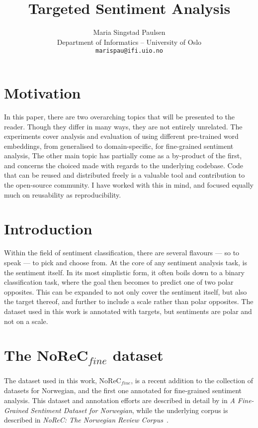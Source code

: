 \documentclass{acl2020}
\title{Targeted Sentiment Analysis}
\author{Maria Singstad Paulsen \\
  Department of Informatics – University of Oslo\\
  \texttt{marispau@ifi.uio.no}}
\date{}
\begin{document}
\maketitle

\begin{abstract}

\end{abstract}

\section{Motivation}
\label{sec:motivation}

In this paper, there are two overarching topics that will be presented to the reader. Though they differ in many ways, they are not entirely unrelated. The experiments cover analysis and evaluation of using different pre-trained word embeddings, from generalised to domain-specific, for fine-grained sentiment analysis, The other main topic has partially come as a by-product of the first, and concerns the choiced made with regards to the underlying codebase. Code that can be reused and distributed freely is a valuable tool and contribution to the open-source community. I have worked with this in mind, and focused equally much on reusability as reproducibility.

\section{Introduction}
\label{sec:intro}

Within the field of sentiment classification, there are several flavours — so to speak — to pick and choose from.
At the core of any sentiment analysis task, is the sentiment itself. In its most simplistic form, it often boils down to a binary classification task, where the goal then becomes to predict one of two polar opposites. This can be expanded to not only cover the sentiment itself, but also the target thereof, and further to include a scale rather than polar opposites. The dataset used in this work is annotated with targets, but sentiments are polar and not on a scale.


\section{The NoReC$_{\mathit{fine}}$ dataset}
\label{sec:data}

The dataset used in this work, NoReC$_{\mathit{fine}}$, is a recent addition to the collection of datasets for Norwegian, and the first one annotated for fine-grained sentiment analysis.
This dataset and annotation efforts are described in detail by \citet{norec_fine} in \emph{A Fine-Grained Sentiment Dataset for Norwegian}, while the underlying corpus is described in \emph{NoReC: The Norwegian Review Corpus}~\citep{velldal-etal-2018-norec}.  \\
\end{document}
